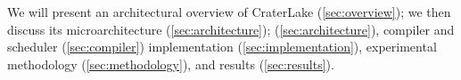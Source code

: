 \documentclass[12pt,twoside]{mitthesis}
\begin{document}
We will present an architectural overview of CraterLake
(\autoref{sec:overview}); we then discuss its microarchitecture
(\autoref{sec:architecture}); (\autoref{sec:architecture}), compiler and
scheduler (\autoref{sec:compiler}) implementation
(\autoref{sec:implementation}), experimental methodology
(\autoref{sec:methodology}), and results (\autoref{sec:results}).










\begin{singlespacing}

\end{singlespacing}
\end{document}
